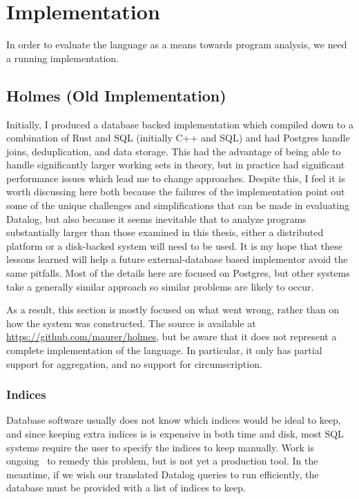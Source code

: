 \section{Implementation}
\label{holmes:sec:impl}
In order to evaluate the language as a means towards program analysis, we need a running implementation.
\subsection{Holmes (Old Implementation)}
Initially, I produced a database backed implementation which compiled down to a combination of Rust and SQL (initially C++ and SQL) and had Postgres handle joins, deduplication, and data storage.
This had the advantage of being able to handle significantly larger working sets in theory, but in practice had significant performance issues which lead me to change approaches.
Despite this, I feel it is worth discussing here both because the failures of the implementation point out some of the unique challenges and simplifications that can be made in evaluating Datalog, but also because it seems inevitable that to analyze programs substantially larger than those examined in this thesis, either a distributed platform or a disk-backed system will need to be used.
It is my hope that these lessons learned will help a future external-database based implementor avoid the same pitfalls.
Most of the details here are focused on Postgres, but other systems take a generally similar approach so similar problems are likely to occur.

As a result, this section is mostly focused on what went wrong, rather than on how the system was constructed.
The source is available at \url{https://github.com/maurer/holmes}, but be aware that it does not represent a complete implementation of the language.
In particular, it only has partial support for aggregation, and no support for circumscription.

\subsubsection{Indices}
Database software usually does not know which indices would be ideal to keep, and since keeping extra indices is is expensive in both time and disk, most SQL systems require the user to specify the indices to keep manually.
Work is ongoing~\cite{peloton} to remedy this problem, but is not yet a production tool.
In the meantime, if we wish our translated Datalog queries to run efficiently, the database must be provided with a list of indices to keep.

